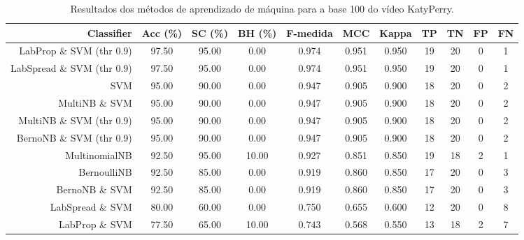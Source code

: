 \begin{table}[!htb]
\centering
\caption{Resultados dos métodos de aprendizado de máquina para a base 100 do vídeo KatyPerry.}
\label{tab:KatyPerry-100}
\begin{tabular}{r|c|c|c|c|c|c|c|c|c|c}
\hline\hline
Classifier & Acc (\%) & SC (\%) & BH (\%) & F-medida & MCC & Kappa & TP & TN & FP & FN \\ \hline
LabProp \& SVM (thr 0.9) & 97.50 & 95.00 & 0.00 & 0.974 & 0.951 & 0.950 & 19 & 20 & 0 & 1 \\ 
LabSpread \& SVM (thr 0.9) & 97.50 & 95.00 & 0.00 & 0.974 & 0.951 & 0.950 & 19 & 20 & 0 & 1 \\ 
SVM & 95.00 & 90.00 & 0.00 & 0.947 & 0.905 & 0.900 & 18 & 20 & 0 & 2 \\ 
MultiNB \& SVM & 95.00 & 90.00 & 0.00 & 0.947 & 0.905 & 0.900 & 18 & 20 & 0 & 2 \\ 
MultiNB \& SVM (thr 0.9) & 95.00 & 90.00 & 0.00 & 0.947 & 0.905 & 0.900 & 18 & 20 & 0 & 2 \\ 
BernoNB \& SVM (thr 0.9) & 95.00 & 90.00 & 0.00 & 0.947 & 0.905 & 0.900 & 18 & 20 & 0 & 2 \\ 
MultinomialNB & 92.50 & 95.00 & 10.00 & 0.927 & 0.851 & 0.850 & 19 & 18 & 2 & 1 \\ 
BernoulliNB & 92.50 & 85.00 & 0.00 & 0.919 & 0.860 & 0.850 & 17 & 20 & 0 & 3 \\ 
BernoNB \& SVM & 92.50 & 85.00 & 0.00 & 0.919 & 0.860 & 0.850 & 17 & 20 & 0 & 3 \\ 
LabSpread \& SVM & 80.00 & 60.00 & 0.00 & 0.750 & 0.655 & 0.600 & 12 & 20 & 0 & 8 \\ 
LabProp \& SVM & 77.50 & 65.00 & 10.00 & 0.743 & 0.568 & 0.550 & 13 & 18 & 2 & 7 \\ 
\hline\hline
\end{tabular}
\end{table}
